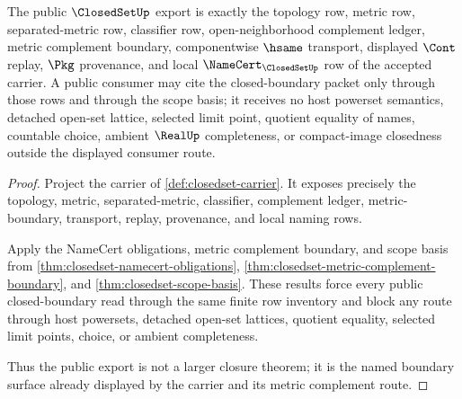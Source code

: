 \begin{theorem}\label{thm:closedset-public-boundary-export}
The public $\ClosedSetUp$ export is exactly the topology row, metric row, separated-metric row, classifier row, open-neighborhood complement ledger, metric complement boundary, componentwise $\hsame$ transport, displayed $\Cont$ replay, $\Pkg$ provenance, and local $\NameCert_{\ClosedSetUp}$ row of the accepted carrier. A public consumer may cite the closed-boundary packet only through those rows and through the scope basis; it receives no host powerset semantics, detached open-set lattice, selected limit point, quotient equality of names, countable choice, ambient $\RealUp$ completeness, or compact-image closedness outside the displayed consumer route.
\end{theorem}
\begin{proof}
Project the carrier of \autoref{def:closedset-carrier}. It exposes precisely the topology, metric, separated-metric, classifier, complement ledger, metric-boundary, transport, replay, provenance, and local naming rows.

Apply the NameCert obligations, metric complement boundary, and scope basis from \autoref{thm:closedset-namecert-obligations}, \autoref{thm:closedset-metric-complement-boundary}, and \autoref{thm:closedset-scope-basis}. These results force every public closed-boundary read through the same finite row inventory and block any route through host powersets, detached open-set lattices, quotient equality, selected limit points, choice, or ambient completeness.

Thus the public export is not a larger closure theorem; it is the named boundary surface already displayed by the carrier and its metric complement route.
\end{proof}

